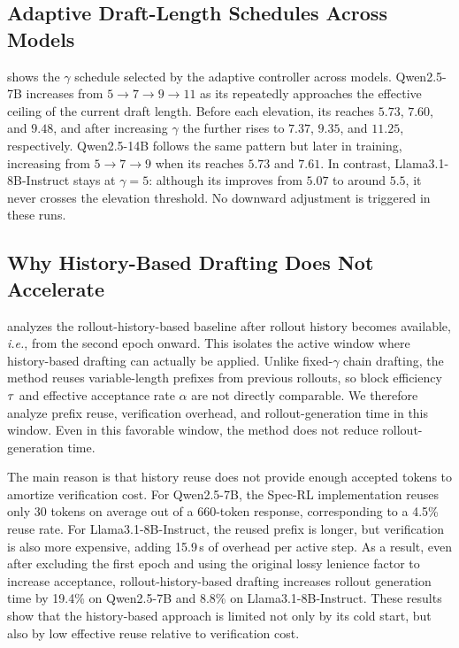 \subsection{Adaptive Draft-Length Schedules Across Models}
\label{app:adaptive_gamma_schedule}

 shows the $\gamma$ schedule selected by the adaptive controller across models.
Qwen2.5-7B increases from $5 \rightarrow 7 \rightarrow 9 \rightarrow 11$ as its \MAL{} repeatedly approaches the effective ceiling of the current draft length.
Before each elevation, its \MAL{} reaches $5.73$, $7.60$, and $9.48$, and after increasing $\gamma$ the \MAL{} further rises to $7.37$, $9.35$, and $11.25$, respectively.
Qwen2.5-14B follows the same pattern but later in training, increasing from $5 \rightarrow 7 \rightarrow 9$ when its \MAL{} reaches $5.73$ and $7.61$.
In contrast, Llama3.1-8B-Instruct stays at $\gamma=5$: although its \MAL{} improves from $5.07$ to around $5.5$, it never crosses the elevation threshold.
No downward adjustment is triggered in these runs.



\subsection{Why History-Based Drafting Does Not Accelerate}
\label{app:why-history-slow}

 analyzes the rollout-history-based baseline after rollout history becomes available, \textit{i.e.}, from the second epoch onward.
This isolates the active window where history-based drafting can actually be applied.
Unlike fixed-$\gamma$ chain drafting, the \history{} method reuses variable-length prefixes from previous rollouts, so block efficiency $\tau$ and effective acceptance rate $\alpha$ are not directly comparable.
We therefore analyze prefix reuse, verification overhead, and rollout-generation time in this window.
Even in this favorable window, the method does not reduce rollout-generation time.

The main reason is that history reuse does not provide enough accepted tokens to amortize verification cost.
For Qwen2.5-7B, the Spec-RL implementation reuses only 30 tokens on average out of a 660-token response, corresponding to a 4.5\% reuse rate.
For Llama3.1-8B-Instruct, the reused prefix is longer, but verification is also more expensive, adding 15.9\,s of overhead per active step.
As a result, even after excluding the first epoch and using the original lossy lenience factor to increase acceptance, rollout-history-based drafting increases rollout generation time by 19.4\% on Qwen2.5-7B and 8.8\% on Llama3.1-8B-Instruct.
These results show that the history-based approach is limited not only by its cold start, but also by low effective reuse relative to verification cost.

